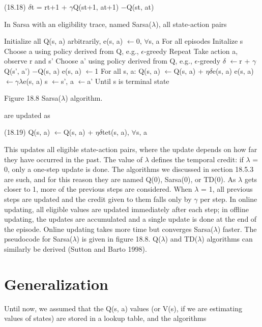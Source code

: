 (18.18) $\delta$t = rt+1 + $\gamma$Q(st+1, at+1) $-$Q(st, at)

In Sarsa with an eligibility trace, named Sarsa($\lambda$), all state-action pairs

Initialize all Q(s, a) arbitrarily, e(s, a) $\leftarrow$0, $\forall$s, a For all episodes Initalize s Choose a using policy derived from Q, e.g., $\epsilon$-greedy Repeat Take action a, observe r and s' Choose a' using policy derived from Q, e.g., $\epsilon$-greedy $\delta$ $\leftarrow$r + $\gamma$Q(s', a') $-$Q(s, a) e(s, a) $\leftarrow$1 For all s, a: Q(s, a) $\leftarrow$Q(s, a) + $\eta$$\delta$e(s, a) e(s, a) $\leftarrow$$\gamma$$\lambda$e(s, a) s $\leftarrow$s', a $\leftarrow$a' Until s is terminal state

Figure 18.8 Sarsa($\lambda$) algorithm.

are updated as

(18.19) Q(s, a) $\leftarrow$Q(s, a) + $\eta$$\delta$tet(s, a), $\forall$s, a

This updates all eligible state-action pairs, where the update depends on how far they have occurred in the past. The value of $\lambda$ defines the temporal credit: if $\lambda$ = 0, only a one-step update is done. The algorithms we discussed in section 18.5.3 are such, and for this reason they are named Q(0), Sarsa(0), or TD(0). As $\lambda$ gets closer to 1, more of the previous steps are considered. When $\lambda$ = 1, all previous steps are updated and the credit given to them falls only by $\gamma$ per step. In online updating, all eligible values are updated immediately after each step; in offline updating, the updates are accumulated and a single update is done at the end of the episode. Online updating takes more time but converges Sarsa($\lambda$) faster. The pseudocode for Sarsa($\lambda$) is given in figure 18.8. Q($\lambda$) and TD($\lambda$) algorithms can similarly be derived (Sutton and Barto 1998).

\section{Generalization}

Until now, we assumed that the Q(s, a) values (or V(s), if we are estimating values of states) are stored in a lookup table, and the algorithms

